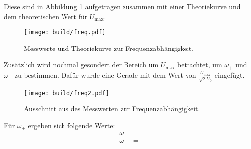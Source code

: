 \noindent
Diese sind in Abbildung \ref{fig:freq} aufgetragen zusammen mit einer Theoriekurve und dem theoretischen
Wert für $U_\text{max}$.
\begin{figure}[H]
    \centering
    \caption{Messwerte und Theoriekurve zur Frequenzabhängigkeit.}
    \label{fig:freq}
    \texttt{[image: build/freq.pdf]}
\end{figure}
\noindent
Zusätzlich wird nochmal gesondert der Bereich um $U_\text{max}$ betrachtet, um $\omega_+$ und $\omega_-$
zu bestimmen. Dafür wurde eine Gerade mit dem Wert von $\frac{U_\text{max}}{\sqrt{2}U_0}$ eingefügt.
\begin{figure}[H]
    \centering
    \caption{Ausschnitt aus des Messwerten zur Frequenzabhängigkeit.}
    \label{fig:freq2}
    \texttt{[image: build/freq2.pdf]}
\end{figure}
\noindent
Für $\omega_\pm$ ergeben sich folgende Werte:
\begin{align}
    \omega_- &=     \\
    \omega_+ &=
\end{align}
%
